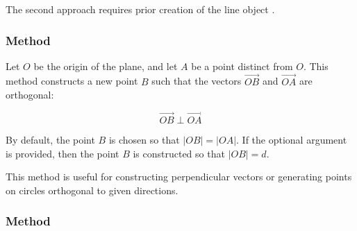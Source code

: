 \noindent
The second approach requires prior creation of the line object .

\vspace{1em}

\begin{tkzexample}[latex=8cm]
\end{tkzexample}

\subsubsection{Method }
\label{ssub:orthogonal_method}

Let $O$ be the origin of the plane, and let $A$ be a point distinct from $O$. This method constructs a new point $B$ such that the vectors $\overrightarrow{OB}$ and $\overrightarrow{OA}$ are orthogonal:

\[
\overrightarrow{OB} \perp \overrightarrow{OA}
\]

\medskip
\noindent
By default, the point $B$ is chosen so that $|OB| = |OA|$. If the optional argument  is provided, then the point $B$ is constructed so that $|OB| = d$.

\medskip
\noindent
This method is useful for constructing perpendicular vectors or generating points on circles orthogonal to given directions.

\vspace{1em}


\begin{tkzexample}[latex=7cm]
\begin{center}
\end{center}
\end{tkzexample}

\subsubsection{Method }
\label{ssub:_point_at_method}

